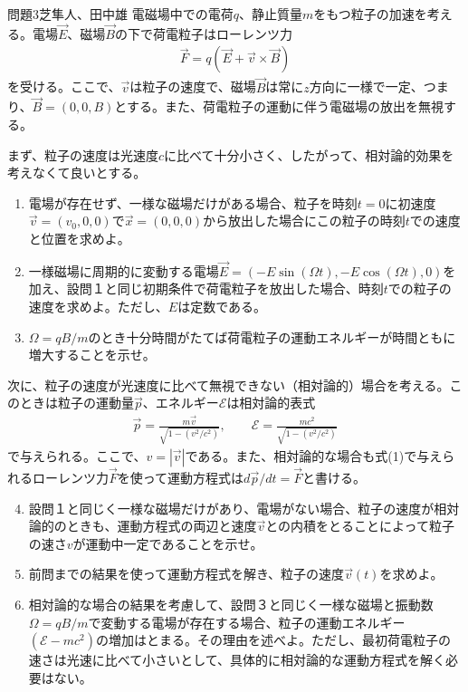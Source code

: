 \documentclass[fleqn]{jbook}
\begin{document}
    \begin{question}{問題3}{芝隼人、田中雄}
	電磁場中での電荷$q$、静止質量$m$をもつ粒子の加速を考える。電場$\vec{E}$、磁場$\vec{B}$の下で荷電粒子はローレンツ力
	    \begin{eqnarray}
		\vec{F}=q(\vec{E}+\vec{v}\times\vec{B})
    \end{eqnarray}
	を受ける。ここで、$\vec{v}$は粒子の速度で、磁場$\vec{B}$は常に$z$方向に一様で一定、つまり、$\vec{B}=(0,0,B)$とする。また、荷電粒子の運動に伴う電磁場の放出を無視する。

	まず、粒子の速度は光速度$c$に比べて十分小さく、したがって、相対論的効果を考えなくて良いとする。
	\begin{enumerate}
	    \item
		 電場が存在せず、一様な磁場だけがある場合、粒子を時刻$t=0$に初速度$\vec{v}=(v_0,0,0)$で$\vec{x}=(0,0,0)$から放出した場合にこの粒子の時刻$t$での速度と位置を求めよ。
	    \item
		 一様磁場に周期的に変動する電場$\vec{E}=(-E\sin (\Omega t),-E\cos (\Omega t) ,0)$を加え、設問１と同じ初期条件で荷電粒子を放出した場合、時刻$t$での粒子の速度を求めよ。ただし、$E$は定数である。
	    \item
		 $\Omega = qB/m$のとき十分時間がたてば荷電粒子の運動エネルギーが時間ともに増大することを示せ。
    \end{enumerate}
	次に、粒子の速度が光速度に比べて無視できない（相対論的）場合を考える。このときは粒子の運動量$\vec{p}$、エネルギー$\mathcal{E}$は相対論的表式
	\begin{eqnarray*}
	    \vec{p} = \frac{m\vec{v}}{\sqrt{1-(v^2/c^2)}},\qquad \mathcal{E} = \frac{mc^2}{\sqrt{1-(v^2/c^2)}}
    \end{eqnarray*}
	で与えられる。ここで、$v=|\vec{v}|$である。また、相対論的な場合も式(1)で与えられるローレンツ力$\vec{F}$を使って運動方程式は$d\vec{p}/dt=\vec{F}$と書ける。
	\begin{enumerate}\setcounter{enumi}{3}
	    \item
		 設問１と同じく一様な磁場だけがあり、電場がない場合、粒子の速度が相対論的のときも、運動方程式の両辺と速度$\vec{v}$との内積をとることによって粒子の速さ$v$が運動中一定であることを示せ。
	    \item
		 前問までの結果を使って運動方程式を解き、粒子の速度$\vec{v}(t)$を求めよ。
	    \item
		 相対論的な場合の結果を考慮して、設問３と同じく一様な磁場と振動数$\Omega =qB/m$で変動する電場が存在する場合、粒子の運動エネルギー$(\mathcal{E}-mc^2)$の増加はとまる。その理由を述べよ。ただし、最初荷電粒子の速さは光速に比べて小さいとして、具体的に相対論的な運動方程式を解く必要はない。
    \end{enumerate}
\end{question}
\end{document}
